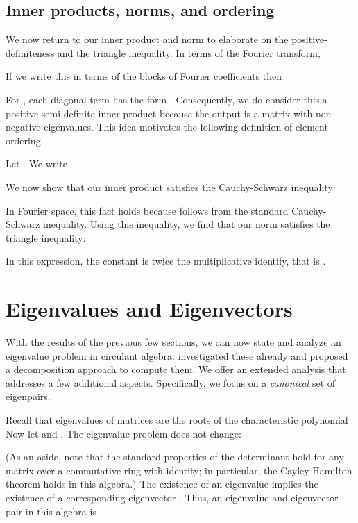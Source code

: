 \documentclass[1p,authoryear,letterpaper]{elsarticle}
\begin{document}
\subsection{Inner products, norms, and ordering}
\label{sec:triangle}

We now return to our inner product and norm to elaborate on the
positive-definiteness and the triangle inequality.
In terms of the Fourier transform,

If we write this in terms of the blocks of Fourier coefficients then

For , each diagonal term has the form .
Consequently, we do consider this a positive semi-definite inner product because
the output  is a matrix with non-negative
eigenvalues.  This idea motivates the following definition of element ordering.
\begin{definition}[Ordering] \label{def:ordering}
 Let .  We write
 
\end{definition}


We now show that our inner product satisfies the Cauchy-Schwarz
inequality:

In Fourier space, this fact holds because
 follows from the
standard Cauchy-Schwarz inequality.  Using this inequality,
we find that our norm satisfies the triangle inequality:

In this expression, the constant  is twice the multiplicative identify, that is .



\section{Eigenvalues and Eigenvectors}
\label{sec:eigen}

With the results of the previous few sections, we can
now state and analyze an eigenvalue problem in
circulant algebra.  \citet{braman201x-tensor-eigenvalues} investigated
these already and proposed a decomposition approach to compute them.
We offer an extended analysis that addresses a few additional aspects.
Specifically, we focus on a {\em canonical} set of eigenpairs.


Recall that eigenvalues of matrices are the roots of the
characteristic polynomial 
Now let 
and .
The eigenvalue problem does not change:

(As an aside, note that the standard properties of the determinant hold for any
matrix over a commutative ring with identity; in particular,
the Cayley-Hamilton theorem holds in this algebra.)
The existence of an eigenvalue implies
the existence of a corresponding eigenvector .
Thus, an eigenvalue and eigenvector pair in this algebra is
\end{document}
